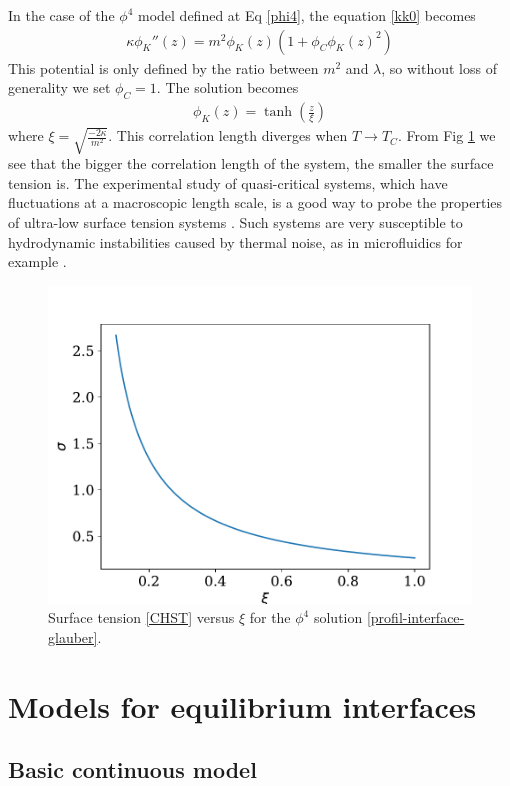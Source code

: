 In the case of the $\phi^4$ model defined at Eq \eqref{phi4}, the equation \eqref{kk0} becomes
\begin{align}
\kappa \phi_K''(z) = m^2 \phi_K(z) \left( 1 + \phi_C \phi_K(z) ^2 \right)
\label{eq-interface-glauber}
\end{align}
This potential is only defined by the ratio between $m^2$ and $\lambda$, so without loss of generality we set $\phi_C = 1$. The solution becomes
\begin{align}
\phi_K(z) = \tanh \left( \frac{z}{\xi} \right)
\label{profil-interface-glauber} 
\end{align}
where $\xi = \sqrt{\frac{-2 \kappa}{m^2}}$. This correlation length diverges when $T\to T_C$.
From Fig \ref{tension-xi} we see that the bigger the correlation length of the system, the smaller the surface tension is. The experimental study of quasi-critical systems, which have fluctuations at a macroscopic length scale, is a good way to probe the properties of ultra-low surface tension systems \cite{hennequin_drop_2006}. Such systems are very susceptible to hydrodynamic instabilities caused by thermal noise, as in microfluidics for example \cite{atencia_controlled_2005}. 
\begin{figure}
\centering
\includegraphics[width=0.7\linewidth]{int-dyn/tension-superficielle.pdf}
\caption{Surface tension \eqref{CHST} versus $\xi$ for the $\phi^4$ solution \eqref{profil-interface-glauber}.}
\label{tension-xi}
\end{figure}


\section{Models for equilibrium interfaces}
\label{sec-continuous}

\subsection{Basic continuous model}

